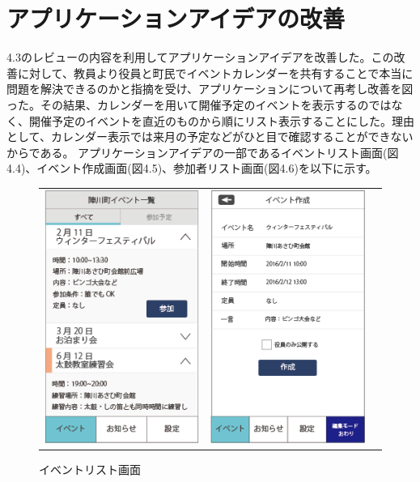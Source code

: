 \section{アプリケーションアイデアの改善}
4.3のレビューの内容を利用してアプリケーションアイデアを改善した。この改善に対して、教員より役員と町民でイベントカレンダーを共有することで本当に問題を解決できるのかと指摘を受け、アプリケーションについて再考し改善を図った。その結果、カレンダーを用いて開催予定のイベントを表示するのではなく、開催予定のイベントを直近のものから順にリスト表示することにした。理由として、カレンダー表示では来月の予定などがひと目で確認することができないからである。
アプリケーションアイデアの一部であるイベントリスト画面(図4.4)、イベント作成画面(図4.5)、参加者リスト画面(図4.6)を以下に示す。
\newpage%
\begin{figure}[h]
    \begin{tabular}{ccc}
      \begin{minipage}[t]{0.3\hsize}
        \centering
        \includegraphics[keepaspectratio, scale=0.5]{process_figures/eventlist.png}
        \caption{イベントリスト画面}
        \label{calender}
      \end{minipage} &
      \begin{minipage}[t]{0.3\hsize}
        \centering
        \includegraphics[keepaspectratio, scale=0.5]{process_figures/new_create_event.png}

\end{minipage}
\end{tabular}
\end{figure}
